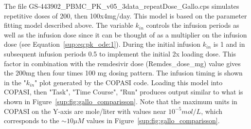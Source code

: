 The file {\selectfont GS-443902\_PBMC\_PK\_v05\_3data\_repeatDose\_Gallo.cps} \hfill  simulates repetitive doses of 200, then 100x4mg/day. This model is based on the parameter fitting model described above. The variable $k_{in}$ controls the infusion periods as well as the infusion dose since it can be thought of as a multiplier on the infusion dose (see Equation~\ref{sup:eq:pk_ode:1}). During the initial infusion $k_{in}$ is 1 and in subsequent infusion periods 0.5 to implement the initial 2x loading dose. This factor in combination with the remdesivir dose (Remdes\_dose\_mg) value gives the 200mg then four times 100 mg dosing pattern. The infusion timing is shown in the "$k_{in}$" plot generated by the COPASI code. Loading this model into COPASI, then "Task", "Time Course", "Run" produces output similar to what is shown in Figure~\ref{sup:fig:gallo_comparisson}. Note that the maximum units in COPASI on the Y-axis are mole/liter with values near $10^{-5}mol/L$, which corresponds to the $\sim 10\mu M$ values in Figure~\ref{sup:fig:gallo_comparisson}.
